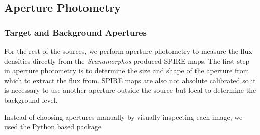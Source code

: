\subsection{Aperture Photometry}\label{aperture}
\subsubsection{Target and Background Apertures}
For the rest of the sources, we perform aperture photometry to measure the flux densities directly from the \textit{Scanamorphos}-produced SPIRE maps. The first step in aperture photometry is to determine the size and shape of the aperture from which to extract the flux from. SPIRE maps are also not absolute calibrated so it is necessary to use another aperture outside the source but local to determine the background level.

Instead of choosing apertures manually by visually inspecting each image, we used the Python based  package 